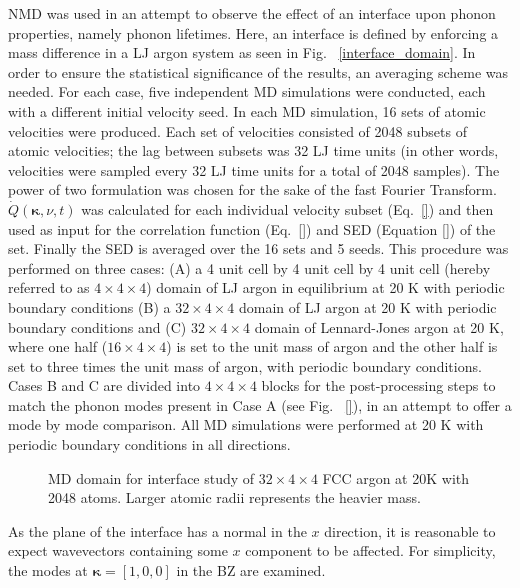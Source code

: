 NMD was used in an attempt to observe the effect of an interface upon phonon properties, namely phonon lifetimes. Here, an interface is defined by enforcing a mass difference in a LJ argon system as seen in Fig. ~\ref{interface_domain}. In order to ensure the statistical significance of the results, an averaging scheme was needed. For each case, five independent MD simulations were conducted, each with a different initial velocity seed. In each MD simulation, 16 sets of atomic velocities were produced. Each set of velocities consisted of 2048 subsets of atomic velocities; the lag between subsets was 32 LJ time units (in other words, velocities were sampled every 32 LJ time units for a total of 2048 samples). The power of two formulation was chosen for the sake of the fast Fourier Transform. $\dot{Q}(\bm{\kappa},\nu,t)$ was calculated for each individual velocity subset (Eq.~\ref{}) and then used as input for the correlation function (Eq.~\ref{}) and SED (Equation \ref{}) of the set. Finally the SED is averaged over the 16 sets and 5 seeds. This procedure was performed on three cases: (A) a 4 unit cell by 4 unit cell by 4 unit cell (hereby referred to as $4\times4\times4$) domain of LJ argon in equilibrium at 20 K with periodic boundary conditions (B) a $32\times4\times4$ domain of LJ argon at 20 K with periodic boundary conditions and (C) $32\times4\times4$ domain of Lennard-Jones argon at 20 K, where one half ($16\times4\times4$) is set to the unit mass of argon and the other half is set to three times the unit mass of argon, with periodic boundary conditions. Cases B and C are divided into $4\times4\times4$ blocks for the post-processing steps to match the phonon modes present in Case A (see Fig. ~\ref{}), in an attempt to offer a mode by mode comparison. All MD simulations were performed at 20 K with periodic boundary conditions in all directions.
\begin{figure}%
\begin{center}
\renewcommand{\figure}{Fig.}
\caption{MD domain for interface study of $32\times4\times4$ FCC argon at 20K with 2048 atoms. Larger atomic radii represents the heavier mass.}
\label{fig:interface_domain}
\end{center}
\end{figure}
As the plane of the interface has a normal in the $x$ direction, it is reasonable to expect wavevectors containing some $x$ component to be affected. For simplicity, the modes at $\bm{\kappa}=[1,0,0]$ in the BZ are examined. 
\renewcommand{\topfraction}{1.0}
